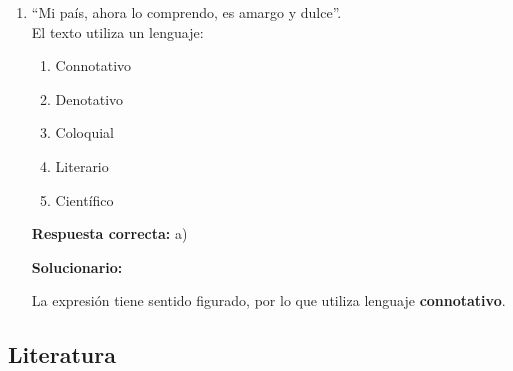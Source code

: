 \begin{enumerate}[resume]
	\vspace{2mm}
	\textbf{Solucionario:}
	
	Esa etapa es la \textbf{redacción}, donde las ideas ya se expresan por escrito.
	
	\vspace{6mm}
	
	\item “Mi país, ahora lo comprendo, es amargo y dulce”.\\
	El texto utiliza un lenguaje:
	\begin{enumerate}[label=\alph*)]
		\item Connotativo
		\item Denotativo
		\item Coloquial
		\item Literario
		\item Científico
	\end{enumerate}
	\textbf{Respuesta correcta:} a)
	
	\vspace{2mm}
	\textbf{Solucionario:}
	
	La expresión tiene sentido figurado, por lo que utiliza lenguaje \textbf{connotativo}.
	
	\vspace{6mm}
	
\end{enumerate}

\subsection*{Literatura}

